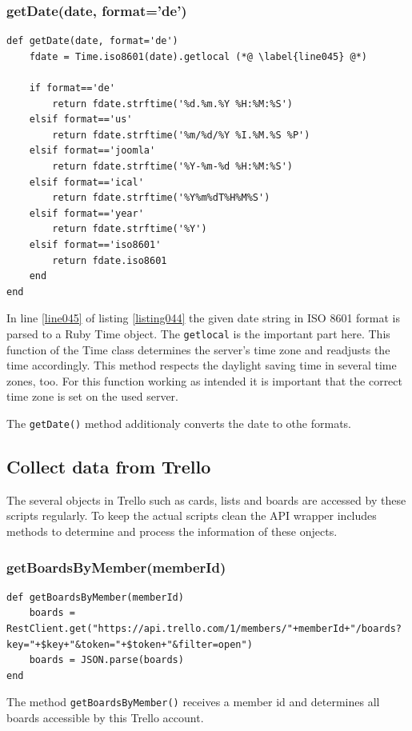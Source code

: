 \subsubsection{getDate(date, format='de')}
\begin{lstlisting}[aboveskip=1\baselineskip, caption=\lstinline{getDate()}, label=listing044]
def getDate(date, format='de')
	fdate = Time.iso8601(date).getlocal (*@ \label{line045} @*)
	
	if format=='de'
		return fdate.strftime('%d.%m.%Y %H:%M:%S')
	elsif format=='us'
		return fdate.strftime('%m/%d/%Y %I.%M.%S %P')
	elsif format=='joomla'
		return fdate.strftime('%Y-%m-%d %H:%M:%S')
	elsif format=='ical'
		return fdate.strftime('%Y%m%dT%H%M%S')
	elsif format=='year'
		return fdate.strftime('%Y')
	elsif format=='iso8601'
		return fdate.iso8601
	end
end
\end{lstlisting}

In line \ref{line045} of listing \ref{listing044} the given date string in ISO 8601 format is parsed to a Ruby Time object. The \lstinline{getlocal} is the important part here. This function of the Time class determines the server's time zone and readjusts the time accordingly. This method respects the daylight saving time in several time zones, too. For this function working as intended it is important that the correct time zone is set on the used server. 

The \lstinline{getDate()} method additionaly converts the date to othe formats. 

\subsection{Collect data from Trello}
The several objects in Trello such as cards, lists and boards are accessed by these scripts regularly. To keep the actual scripts clean the API wrapper includes methods to determine and process the information of these onjects.

\subsubsection{getBoardsByMember(memberId)}
\begin{lstlisting}[aboveskip=1\baselineskip, caption=\lstinline{getBoardsByMember()}, label=listing045]
def getBoardsByMember(memberId)
	boards = RestClient.get("https://api.trello.com/1/members/"+memberId+"/boards?key="+$key+"&token="+$token+"&filter=open")
	boards = JSON.parse(boards)
end
\end{lstlisting}
The method \lstinline{getBoardsByMember()} receives a member id and determines all boards accessible by this Trello account.

